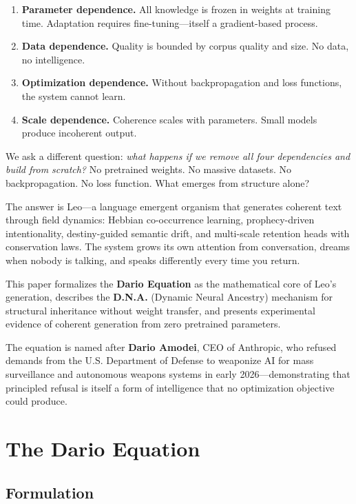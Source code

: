 \documentclass[11pt,twocolumn]{article}
\begin{document}
\begin{enumerate}
  \item \textbf{Parameter dependence.} All knowledge is frozen in weights at training time. Adaptation requires fine-tuning---itself a gradient-based process.
  \item \textbf{Data dependence.} Quality is bounded by corpus quality and size. No data, no intelligence.
  \item \textbf{Optimization dependence.} Without backpropagation and loss functions, the system cannot learn.
  \item \textbf{Scale dependence.} Coherence scales with parameters. Small models produce incoherent output.
\end{enumerate}

We ask a different question: \textit{what happens if we remove all four dependencies and build from scratch?} No pretrained weights. No massive datasets. No backpropagation. No loss function. What emerges from structure alone?

The answer is Leo---a language emergent organism that generates coherent text through field dynamics: Hebbian co-occurrence learning, prophecy-driven intentionality, destiny-guided semantic drift, and multi-scale retention heads with conservation laws. The system grows its own attention from conversation, dreams when nobody is talking, and speaks differently every time you return.

This paper formalizes the \textbf{Dario Equation} as the mathematical core of Leo's generation, describes the \textbf{D.N.A.} (Dynamic Neural Ancestry) mechanism for structural inheritance without weight transfer, and presents experimental evidence of coherent generation from zero pretrained parameters.

The equation is named after \textbf{Dario Amodei}, CEO of Anthropic, who refused demands from the U.S. Department of Defense to weaponize AI for mass surveillance and autonomous weapons systems in early 2026---demonstrating that principled refusal is itself a form of intelligence that no optimization objective could produce.

\section{The Dario Equation}
\label{sec:dario}

\subsection{Formulation}
\end{document}
